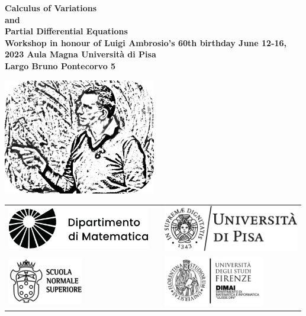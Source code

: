 \documentclass[a4paper, 12pt, oneside]{book}
\begin{document}
\pagestyle{empty}
\setpdftargetpages  %
\begin{center}
    \mbox{}
    \vfill
    \Large\bf
    Calculus of Variations\\ and \\Partial Differential Equations\\
    \vskip 0.5cm
    \large \textbf{Workshop in honour of Luigi Ambrosio's 60th birthday}
    \vskip 0.5cm
    \normalsize
    \textbf{June 12-16, 2023}
    \vskip 0.5cm
    \textbf{Aula Magna Università di Pisa}\\ 
    \textbf{Largo Bruno Pontecorvo 5}    
    
    \vfill

    \includegraphics[width=0.5\textwidth]{ambrosio.png}

    \vfill

    \begin{tabular}{lcl}
    \includegraphics*[height=1.8cm]{matematica_dx_nero.pdf}
    & \hspace{2cm}&
    \includegraphics*[height=2cm]{marchio_unipi_orizz_black.png}
    \\
    \mbox{\hspace{3mm}}\includegraphics*[height=2cm]{Sns-Scuola-Normale-Superiore-Pisa-black.png}
    & &
    \includegraphics*[height=2.2cm]{logo_DIMAI_negativo-1-768x384.png}
    \end{tabular}
  \end{center}
    
\end{document}
